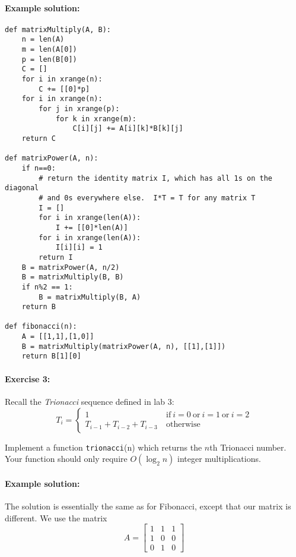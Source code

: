 \documentclass[11pt]{article}
\begin{document}
\paragraph{Example solution:}
\begin{verbatim}
def matrixMultiply(A, B):
    n = len(A)
    m = len(A[0])
    p = len(B[0])
    C = []
    for i in xrange(n):
        C += [[0]*p]
    for i in xrange(n):
        for j in xrange(p):
            for k in xrange(m):
                C[i][j] += A[i][k]*B[k][j]
    return C

def matrixPower(A, n):
    if n==0:
        # return the identity matrix I, which has all 1s on the diagonal
        # and 0s everywhere else.  I*T = T for any matrix T
        I = []
        for i in xrange(len(A)):
            I += [[0]*len(A)]
        for i in xrange(len(A)):
            I[i][i] = 1
        return I
    B = matrixPower(A, n/2)
    B = matrixMultiply(B, B)
    if n%2 == 1:
        B = matrixMultiply(B, A)
    return B

def fibonacci(n):
    A = [[1,1],[1,0]]
    B = matrixMultiply(matrixPower(A, n), [[1],[1]])
    return B[1][0]
\end{verbatim}

\paragraph{Exercise 3:}
Recall the {\em Trionacci} sequence defined in lab 3:
$$
T_i = \begin{cases} 1 \ &
  \mathrm{if}\ i=0\ \mathrm{or}\ i = 1 \ \mathrm{or}\ i=2
\\ T_{i-1} + T_{i-2} + T_{i-3} \
&\mathrm{otherwise} \end{cases}
$$

Implement a function \texttt{trionacci}(n) which returns the $n$th
Trionacci number. Your function should only require $O(\log_2 n)$
integer multiplications.

\paragraph{Example solution:}
The solution is essentially the same as for Fibonacci, except that our
matrix is different.  We use the matrix
$$ A = \left[
\begin{array}{ccc}
1 & 1 & 1\\
1 & 0 & 0\\
0&1&0
\end{array}
\right]$$
\end{document}
